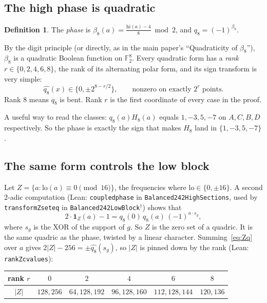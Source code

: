 \documentclass[11pt]{article}
\theoremstyle{definition}
\newtheorem{definition}[theorem]{Definition}
\theoremstyle{remark}
\newcommand{\F}{\mathbb{F}}
\newcommand{\ind}{\mathbf{1}}
\newcommand{\lo}{\mathrm{lo}}
\newcommand{\hi}{\mathrm{hi}}
\newcommand{\code}[1]{\texttt{#1}}
\DeclareRobustCommand{\_}{\textunderscore\allowbreak}
\begin{document}
\subsection{The high phase is quadratic}

\begin{definition}
The \emph{phase} is $\beta_8(a)=\frac{\hi(a)-4}{8}\bmod 2$, and $q_8=(-1)^{\beta_8}$.
\end{definition}

By the digit principle (or directly, as in the main paper's ``Quadraticity of $\beta_8$''), $\beta_8$ is a quadratic Boolean function on $\F_2^8$. Every quadratic form has a \emph{rank} $r\in\{0,2,4,6,8\}$, the rank of its alternating polar form, and its sign transform is very simple:
\[
  \widehat{q_8}(x)\in\{0,\pm2^{8-r/2}\},\qquad\text{nonzero on exactly }2^r\text{ points.}
\]
Rank $8$ means $q_8$ is bent. Rank $r$ is the first coordinate of every case in the proof.

A useful way to read the classes: $q_8(a)H_8(a)$ equals $1,-3,5,-7$ on $A,C,B,D$ respectively. So the phase is exactly the sign that makes $H_8$ land in $\{1,-3,5,-7\}$.

\subsection{The same form controls the low block}

Let $Z=\{a:\lo(a)\equiv0\pmod{16}\}$, the frequencies where $\lo\in\{0,\pm16\}$. A second $2$-adic computation (Lean: \code{coupled\_phase} in \code{Balanced242HighSections}, used by \code{transform\_Zset\_eq} in \code{Balanced242LowBlock}$^\dagger$) shows that
\begin{equation}\label{eq:Zq}
  2\cdot\ind_Z(a)-1=q_8(0)\,q_8(a)\,(-1)^{a\cdot s_g},
\end{equation}
where $s_g$ is the XOR of the support of $g$. So $Z$ is the zero set of a quadric. It is the same quadric as the phase, twisted by a linear character. Summing~\eqref{eq:Zq} over $a$ gives $2|Z|-256=\pm\widehat{q_8}(s_g)$, so $|Z|$ is pinned down by the rank (Lean: \code{rank\_Zc\_values}):

\begin{center}
\begin{tabular}{@{}cccccc@{}}
\toprule
rank $r$ & $0$ & $2$ & $4$ & $6$ & $8$\\
\midrule
$|Z|$ & $128,256$ & $64,128,192$ & $96,128,160$ & $112,128,144$ & $120,136$\\
\bottomrule
\end{tabular}
\end{center}
\end{document}

